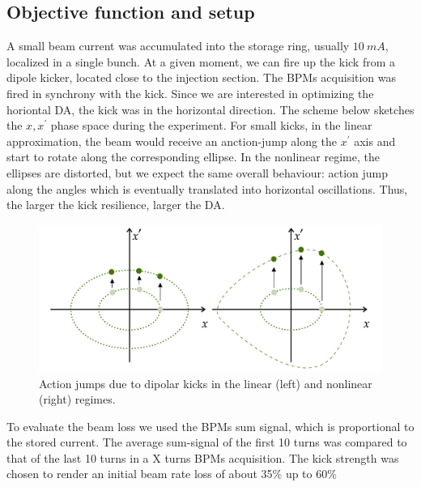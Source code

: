 \subsection{Objective function and setup}
A small beam current was accumulated into the storage ring, usually $10~\unit{mA}$, localized in a single bunch. At a given moment, we can fire up the kick from a dipole kicker, located close to the injection section. The BPMs acquisition was fired in synchrony with the kick. Since we are interested in optimizing the horiontal DA, the kick was in the horizontal direction. The scheme below sketches the $x,x^\prime$ phase space during the experiment. For small kicks, in the linear approximation, the beam would receive an anction-jump along the $x^\prime$ axis and start to rotate along the corresponding ellipse. In the nonlinear regime, the ellipses are distorted, but we expect the same overall behaviour: action jump along the angles which is eventually translated into horizontal oscillations. Thus, the larger the kick resilience, larger the DA.
\begin{figure}
    \centering
    \includegraphics[width=\textwidth]{Images/phase_space_kick.pdf}
    \caption{Action jumps due to dipolar kicks in the linear (left) and nonlinear (right) regimes.}
\end{figure}
To evaluate the beam loss we used the BPMs sum signal, which is proportional to the stored current. The average sum-signal of the first 10 turns was compared to that of the last 10 turns in a X turns BPMs acquisition. The kick strength was chosen to render an initial beam rate loss of about 35\% up to 60\%
